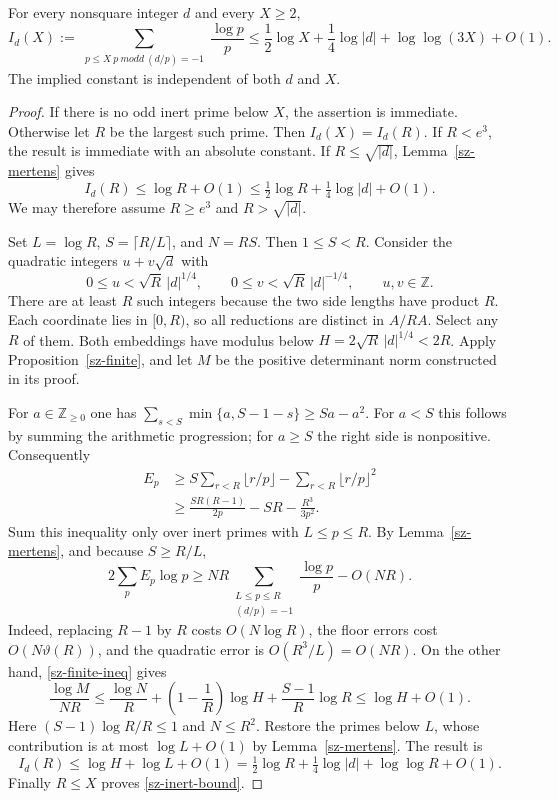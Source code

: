 \begin{theorem}\label{sz-inert}
For every nonsquare integer $d$ and every $X\ge2$,
\begin{equation}\label{sz-inert-bound}
 I_d(X):=\sum_{\substack{p\le X\ p\ {
m odd}\ (d/p)=-1}}
            \frac{\log p}{p}
 \le\frac12\log X+\frac14\log|d|+\log\log(3X)+O(1).
\end{equation}
The implied constant is independent of both $d$ and $X$.
\end{theorem}
\begin{proof}
If there is no odd inert prime below $X$, the assertion is immediate.
Otherwise let $R$ be the largest such prime. Then $I_d(X)=I_d(R)$.
If $R<e^3$, the result is immediate with an absolute constant. If
$R\le\sqrt{|d|}$, Lemma~\ref{sz-mertens} gives
\[
 I_d(R)\le\log R+O(1)
 \le\tfrac12\log R+\tfrac14\log|d|+O(1).
\]
We may therefore assume $R\ge e^3$ and $R>\sqrt{|d|}$.

Set $L=\log R$, $S=\lceil R/L\rceil$, and $N=RS$. Then $1\le S<R$.
Consider the quadratic integers $u+v\sqrt d$ with
\[
 0\le u<\sqrt R\,|d|^{1/4},
 \qquad0\le v<\sqrt R\,|d|^{-1/4},\qquad u,v\in\mathbb Z.
\]
There are at least $R$ such integers because the two side lengths have
product $R$. Each coordinate lies in $[0,R)$, so all reductions are distinct
in $A/RA$. Select any $R$ of them. Both embeddings have modulus below
$H=2\sqrt R\,|d|^{1/4}<2R$. Apply Proposition~\ref{sz-finite},
and let $M$ be the positive determinant norm constructed in its proof.

For $a\in\mathbb Z_{\ge0}$ one has
$\sum_{s<S}\min\{a,S-1-s\}\ge Sa-a^2$.
For $a<S$ this follows by summing the arithmetic progression; for $a\ge S$
the right side is nonpositive. Consequently
\begin{align*}
 E_p&\ge S\sum_{r<R}\lfloor r/p\rfloor-
              \sum_{r<R}\lfloor r/p\rfloor^2\\
 &\ge\frac{SR(R-1)}{2p}-SR-\frac{R^3}{3p^2}.
\end{align*}
Sum this inequality only over inert primes with $L\le p\le R$.
By Lemma~\ref{sz-mertens}, and because $S\ge R/L$,
\[
 2\sum_pE_p\log p
 \ge NR\sum_{\substack{L\le p\le R\\(d/p)=-1}}
           \frac{\log p}{p}-O(NR).
\]
Indeed, replacing $R-1$ by $R$ costs $O(N\log R)$, the floor errors
cost $O(N\vartheta(R))$, and the quadratic error is
$O(R^3/L)=O(NR)$.
On the other hand, \eqref{sz-finite-ineq} gives
\[
 \frac{\log M}{NR}
 \le\frac{\log N}{R}+\left(1-\frac1R\right)\log H
       +\frac{S-1}{R}\log R
 \le\log H+O(1).
\]
Here $(S-1)\log R/R\le1$ and $N\le R^2$.
Restore the primes below $L$, whose contribution is at most
$\log L+O(1)$ by Lemma~\ref{sz-mertens}. The result is
\[
 I_d(R)\le\log H+\log L+O(1)
 =\tfrac12\log R+\tfrac14\log|d|+\log\log R+O(1).
\]
Finally $R\le X$ proves \eqref{sz-inert-bound}.
\end{proof}

